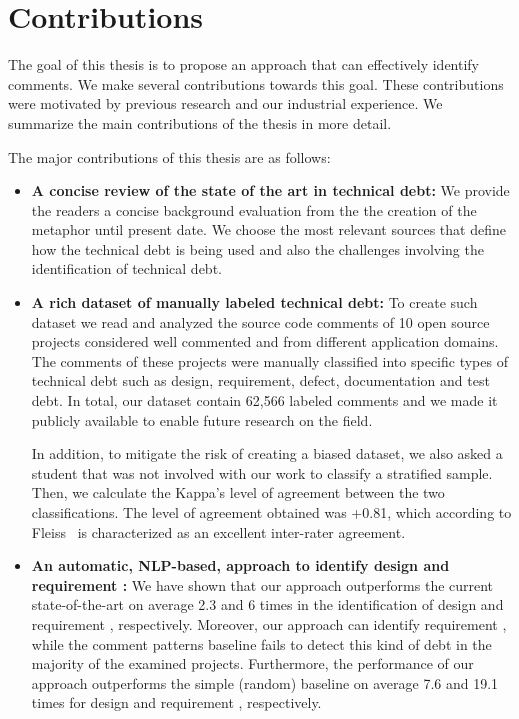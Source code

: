 \section{Contributions}

The goal of this thesis is to propose an approach that can effectively identify \SATD comments. We make several contributions towards this goal. These contributions were motivated by previous research and our industrial experience. We summarize the main contributions of the thesis in more detail.

The major contributions of this thesis are as follows:
\begin{itemize}

\item \textbf{A concise review of the state of the art in technical debt:} We provide the readers a concise background evaluation from the the creation of the metaphor until present date. We choose the most relevant sources that define how the technical debt is being used and also the challenges involving the identification of technical debt.

\item \textbf{A rich dataset of manually labeled technical debt:} To create such dataset we read and analyzed the source code comments of 10 open source projects considered well commented and from different application domains. The comments of these projects were manually classified into specific types of technical debt such as design, requirement, defect, documentation and test debt. In total, our dataset contain 62,566 labeled comments and we made it publicly available to enable future research on the field. 

In addition, to mitigate the risk of creating a biased dataset, we also asked a student that was not involved with our work to classify a stratified sample. Then, we calculate the Kappa's level of agreement between the two classifications. The level of agreement obtained was +0.81, which according to Fleiss~\cite{Fleiss1981measurement} is characterized as an excellent inter-rater agreement.

\item \textbf{An automatic, NLP-based, approach to identify design and requirement \SATD:} We have shown that our approach outperforms the current state-of-the-art on average 2.3 and 6 times in the identification of design and requirement \SATD, respectively. Moreover, our approach can identify requirement \SATD, while the comment patterns baseline fails to detect this kind of debt in the majority of the examined projects. Furthermore, the performance of our approach outperforms the simple (random) baseline on average 7.6 and 19.1 times for design and requirement \SATD, respectively. 


\end{itemize}
